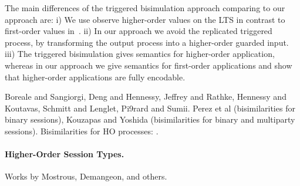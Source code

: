 The main differences of the triggered
bisimulation approach comparing to our approach are:
i) We use observe higher-order values on the LTS in contrast to first-order 
values in~\cite{DBLP:journals/lmcs/JeffreyR05}.
ii) In our approach we avoid the replicated triggered process,
by transforming the output process into a higher-order guarded input.
iii) The triggered bisimulation gives semantics for higher-order application,
whereas in our approach we give semantics for first-order applications
and show that higher-order applications are fully encodable.

Boreale and Sangiorgi, 
Deng and Hennessy, 
Jeffrey and Rathke, Hennessy and Koutavas, Schmitt and Lenglet, Pi\E9rard and Sumii.
Perez et al (bisimilarities for binary sessions), Kouzapas and Yoshida (bisimilarities for binary and multiparty sessions).
Bisimilarities for HO processes: \cite{Xu07}.

\paragraph{Higher-Order Session Types.}
Works by Mostrous, Demangeon, and others.

